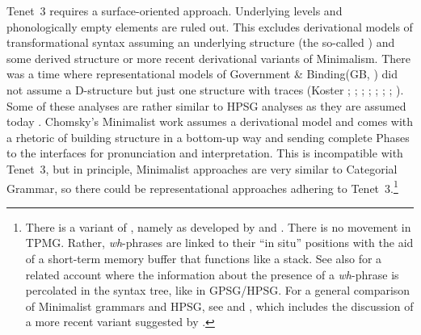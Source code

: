 \documentclass[output=paper,biblatex,babelshorthands,newtxmath,draftmode,colorlinks,citecolor=brown]{langscibook}
\begin{document}
Tenet~3 requires a surface-oriented approach. Underlying levels and phonologically empty elements
are ruled out. This excludes derivational models of transformational syntax assuming an underlying
structure (the so-called ) and some derived structure or more recent derivational variants of Minimalism. There was a time
where representational models of Government \& Binding\indexgb (GB, \citealt{Chomsky81a}) did not assume a D-structure but just one structure with
traces (Koster \citeyear[\page ]{Koster78b-u}; \citeyear[]{Koster87a-u};
\citealp{KT91a}; \citealp[Section~1.4]{Haider93a};
\citealp[]{Frey93a}; \citealp[--88, 177--178]{Lohnstein93a-u}; \citealp[]{FC94a}; \citealp[]{Veenstra98a}). Some of these analyses are rather similar to HPSG
analyses as they are assumed today \citep{Kiss95a,BvN98a,Meurers2000b,Mueller2005c,MuellerGS,MuellerGermanic}. Chomsky's Minimalist work \citep{Chomsky95a-u} assumes a derivational model and comes
with a rhetoric of building structure in a bottom-up way and sending complete Phases to the
interfaces for pronunciation and interpretation. This is incompatible with Tenet~3, but in principle,
Minimalist approaches are very similar to Categorial Grammar, so there could be representational
approaches adhering to Tenet~3.\footnote{%
  There is a variant of  \citep{Stabler2010b}, namely  as developed by \citet{Chesi2004a-u,Chesi2007a-u} and \citet{BC2006a-u,BC2012a-u}. There is
  no movement in TPMG. Rather, \emph{wh}-phrases are linked to their ``in situ'' positions with the
aid of a short-term memory  buffer that functions like a stack. See
also \citet{Hunter2010a-u,Hunter2019a-u} for a related account where the
information about the presence of a \emph{wh}-phrase is percolated in the
syntax tree, like in GPSG\indexgpsg/HPSG. For a general comparison of Minimalist grammars and HPSG, see
 and , which includes the discussion of a more
recent variant suggested by \citet{Torr2019a-u}.
}
\end{document}
